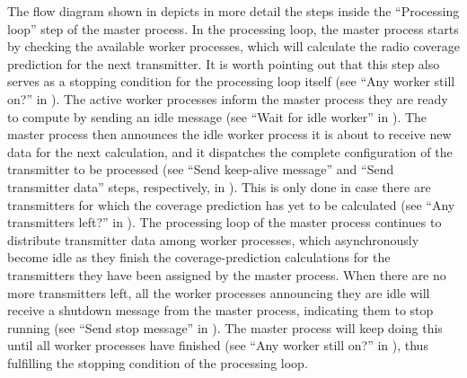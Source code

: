 The flow diagram shown in 
depicts in more detail the steps inside the ``Processing loop''
step of the master process. In the processing loop, the master process
starts by checking the available worker processes, which will calculate
the radio coverage prediction for the next transmitter. It is worth
pointing out that this step also serves as a stopping condition for
the processing loop itself (see ``Any worker still on?'' in ).
The active worker processes inform the master process they are ready
to compute by sending an idle message (see ``Wait for idle worker''
in ). The master
process then announces the idle worker process it is about to receive
new data for the next calculation, and it dispatches the complete
configuration of the transmitter to be processed (see ``Send keep-alive
message'' and ``Send transmitter data'' steps, respectively, in
). This is only
done in case there are transmitters for which the coverage prediction
has yet to be calculated (see ``Any transmitters left?'' in ).
The processing loop of the master process continues to distribute
transmitter data among worker processes, which asynchronously become
idle as they finish the coverage-prediction calculations for the transmitters
they have been assigned by the master process. When there are no more
transmitters left, all the worker processes announcing they are idle
will receive a shutdown message from the master process, indicating
them to stop running (see ``Send stop message'' in ).
The master process will keep doing this until all worker processes
have finished (see ``Any worker still on?'' in ),
thus fulfilling the stopping condition of the processing loop.

